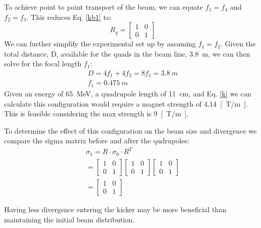 To achieve point to point transport of the beam, we can 
equate $f_1 = f_4$ and $f_2 = f_3$. This reduces Eq. \ref{kb1} to:
 \begin{equation}
R_q =
\begin{bmatrix}
1 & 0 \\
0 & 1	
\end{bmatrix}
\end{equation}
We can further simplify the experimental set up by 
assuming $f_1=f_2$. Given the total distance, D, available for the
quads in the beam line, \SI{3.8}{m}, we can then solve
for the focal length $f_1$: 
\begin{align}
	D = 4f_1 + 4 f_2 = 8f_1 = \SI{3.8}{m} \\
	f_1 = \SI{0.475}{m}
\end{align}
Given an energy of \SI{65}{MeV}, a quadrupole length of \SI{11}{cm}, 
and Eq. \ref{k} we can calculate this configuration would require a 
magnet strength of \SI{4.14}{[T/m]}. This is feasible considering the 
max strength is \SI{9}{[T/m]}.

To determine the effect of this configuration on the beam size and divergence
we compare the sigma matrix before and after the qudrupoles:
\begin{align}
	\sigma_1 = R\cdot \sigma_0 \cdot R^T \\
	= 
	\begin{bmatrix}
	1 & 0 \\
	0 & 1	
	\end{bmatrix}
	\begin{bmatrix}
	1 & 0 \\
	0 & 1	
	\end{bmatrix}
    \begin{bmatrix}
	1 & 0 \\
	0 & 1	
	\end{bmatrix} \\
	=
	\begin{bmatrix}
	1 & 0 \\
	0 & 1	
	\end{bmatrix}
\end{align}

Having less divergence entering the kicker may be more beneficial than 
maintaining the initial beam distribution. 

 
